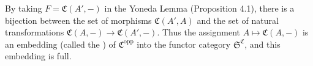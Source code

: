 By taking $F = \mathfrak{C}(A', -)$ in the Yoneda Lemma (Proposition 4.1), there is a bijection between the set of morphisms $\mathfrak{C}(A', A)$ and the set of natural transformations $\mathfrak{C}(A, -) \to \mathfrak{C}(A', -)$. Thus the assignment $A \mapsto \mathfrak{C}(A, -)$ is an embedding (called the ) of $\mathfrak{C}^{\text{opp}}$ into the functor category $\mathfrak{S}^{\mathfrak{C}}$, and this embedding is full.
